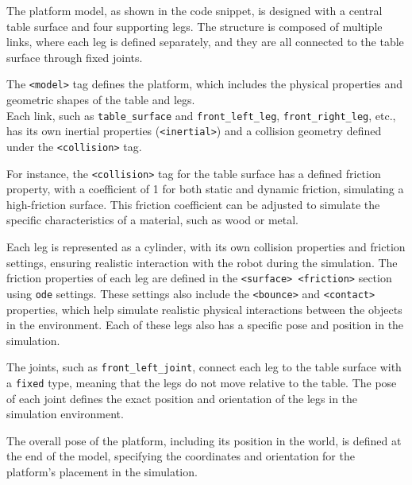 \documentclass[../../main]{subfiles}
\begin{document}
    The platform model, as shown in the code snippet, is designed with a central table surface and four supporting legs. 
The structure is composed of multiple links, where each leg is defined separately, and they are all connected to the table surface through fixed joints.

The \texttt{<model>} tag defines the platform, which includes the physical properties and\\ geometric shapes of the table and legs. \\
Each link, such as \texttt{table\_surface} and \texttt{front\_left\_leg}, \texttt{front\_right\_leg}, etc., has its own inertial properties (\texttt{<inertial>}) 
and a collision geometry defined under the \texttt{<collision>} tag. 

For instance, the \texttt{<collision>} tag for the table surface has a defined friction property, with a coefficient of 1 for both static and dynamic friction, 
simulating a high-friction surface. This friction coefficient can be adjusted to simulate the specific characteristics of a material, such as wood or metal.

Each leg is represented as a cylinder, with its own collision properties and friction settings, ensuring realistic interaction with the robot 
during the simulation. The friction properties of each leg are defined in the \texttt{<surface> \texttt{<friction>}} section using \texttt{ode} settings. 
These settings also include the \texttt{<bounce>} and \texttt{<contact>} properties, which help simulate realistic physical interactions between the objects in the environment. 
Each of these legs also has a specific pose and position in the simulation.

The joints, such as \texttt{front\_left\_joint}, connect each leg to the table surface with a \texttt{fixed} type, meaning that the legs do not move relative to the table. 
The pose of each joint defines the exact position and orientation of the legs in the simulation environment.

The overall pose of the platform, including its position in the world, is defined at the end of the model, specifying the coordinates and orientation 
for the platform's placement in the simulation. 
\end{document}
